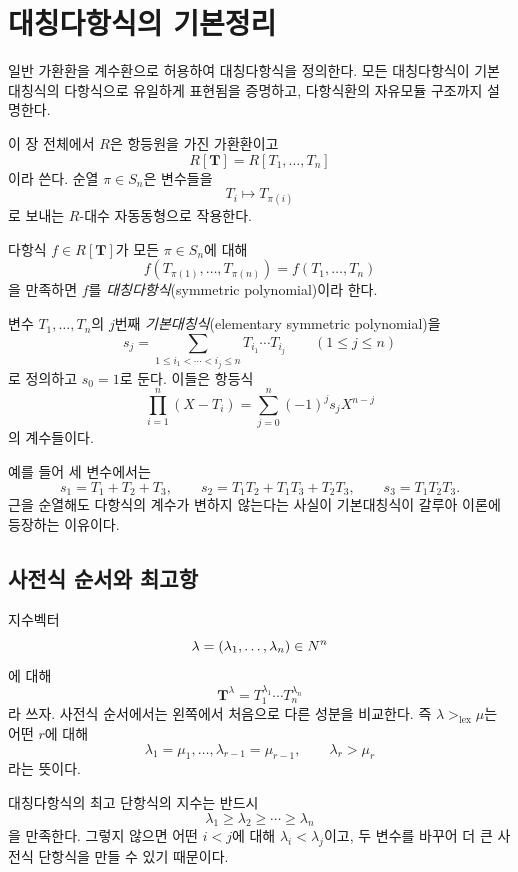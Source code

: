 \clearpage
\section{대칭다항식의 기본정리}
\label{sec:fundamental-symmetric-polynomials}

\begin{learninggoal}
일반 가환환을 계수환으로 허용하여 대칭다항식을 정의한다. 모든 대칭다항식이 기본대칭식의 다항식으로 유일하게 표현됨을 증명하고, 다항식환의 자유모듈 구조까지 설명한다.
\end{learninggoal}

이 장 전체에서 $R$은 항등원을 가진 가환환이고
\[
  R[\mathbf T]=R[T_1,\dots,T_n]
\]
이라 쓴다. 순열 $\pi\in S_n$은 변수들을
\[
  T_i\longmapsto T_{\pi(i)}
\]
로 보내는 $R$-대수 자동동형으로 작용한다.

\begin{definition}[대칭다항식]
다항식 $f\in R[\mathbf T]$가 모든 $\pi\in S_n$에 대해
\[
  f(T_{\pi(1)},\dots,T_{\pi(n)})
  =f(T_1,\dots,T_n)
\]
을 만족하면 $f$를 \emph{대칭다항식}(symmetric polynomial)이라 한다.
\end{definition}

\begin{definition}[기본대칭식]
변수 $T_1,\dots,T_n$의 $j$번째 \emph{기본대칭식}(elementary symmetric polynomial)을
\[
  s_j=
  \sum_{1\le i_1<\cdots<i_j\le n}
  T_{i_1}\cdots T_{i_j}
  \qquad(1\le j\le n)
\]
로 정의하고 $s_0=1$로 둔다. 이들은 항등식
\[
  \prod_{i=1}^n(X-T_i)
  =\sum_{j=0}^n(-1)^j s_jX^{n-j}
\]
의 계수들이다.
\end{definition}

예를 들어 세 변수에서는
\[
  s_1=T_1+T_2+T_3,
  \qquad
  s_2=T_1T_2+T_1T_3+T_2T_3,
  \qquad
  s_3=T_1T_2T_3.
\]
근을 순열해도 다항식의 계수가 변하지 않는다는 사실이 기본대칭식이 갈루아 이론에 등장하는 이유이다.

\subsection{사전식 순서와 최고항}

지수벡터
\[
  \lambda=(\lambda_1,\dots,\lambda_n)\in N^n
\]
에 대해
\[
  \mathbf T^\lambda=T_1^{\lambda_1}\cdots T_n^{\lambda_n}
\]
라 쓰자. 사전식 순서에서는 왼쪽에서 처음으로 다른 성분을 비교한다. 즉 $\lambda>_{\mathrm{lex}}\mu$는 어떤 $r$에 대해
\[
  \lambda_1=\mu_1,\dots,\lambda_{r-1}=\mu_{r-1},
  \qquad
  \lambda_r>\mu_r
\]
라는 뜻이다.

대칭다항식의 최고 단항식의 지수는 반드시
\[
  \lambda_1\ge\lambda_2\ge\cdots\ge\lambda_n
\]
을 만족한다. 그렇지 않으면 어떤 $i<j$에 대해 $\lambda_i<\lambda_j$이고, 두 변수를 바꾸어 더 큰 사전식 단항식을 만들 수 있기 때문이다.

